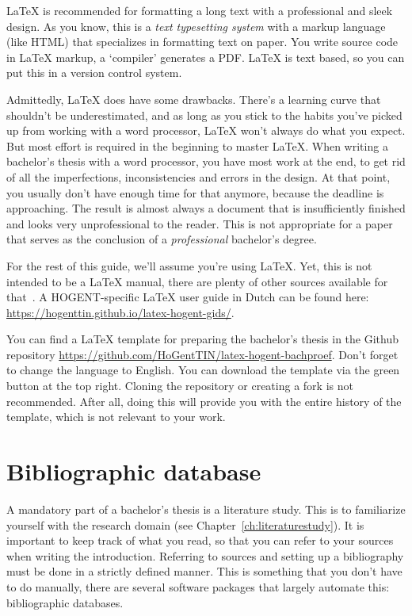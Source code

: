 {\LaTeX} is recommended for formatting a long text with a professional and sleek design. As you know, this is a \emph{text typesetting system} with a markup language (like HTML) that specializes in formatting text on paper. You write source code in {\LaTeX} markup, a `compiler' generates a PDF. {\LaTeX} is text based, so you can put this in a version control system.

Admittedly, {\LaTeX} does have some drawbacks. There's a learning curve that shouldn't be underestimated, and as long as you stick to the habits you've picked up from working with a word processor, {\LaTeX} won't always do what you expect. But most effort is required in the beginning to master {\LaTeX}. When writing a bachelor's thesis with a word processor, you have most work at the end, to get rid of all the imperfections, inconsistencies and errors in the design. At that point, you usually don't have enough time for that anymore, because the deadline is approaching. The result is almost always a document that is insufficiently finished and looks very unprofessional to the reader. This is not appropriate for a paper that serves as the conclusion of a \textit{professional} bachelor's degree.

For the rest of this guide, we'll assume you're using {\LaTeX}. Yet, this is not intended to be a {\LaTeX} manual, there are plenty of other sources available for that~\parencite{Oetiker2015}. A HOGENT-specific {\LaTeX} user guide in Dutch can be found here: \url{https://hogenttin.github.io/latex-hogent-gids/}.

You can find a {\LaTeX} template for preparing the bachelor's thesis in the Github repository \url{https://github.com/HoGentTIN/latex-hogent-bachproef}. Don't forget to change the language to English. You can download the template via the green button at the top right. Cloning the repository or creating a fork is not recommended. After all, doing this will provide you with the entire history of the template, which is not relevant to your work.

\section{Bibliographic database}
\label{sec:bibliografic-database}

A mandatory part of a bachelor's thesis is a literature study. This is to familiarize yourself with the research domain (see Chapter~\ref{ch:literaturestudy}). It is important to keep track of what you read, so that you can refer to your sources when writing the introduction. Referring to sources and setting up a bibliography must be done in a strictly defined manner. This is something that you don't have to do manually, there are several software packages that largely automate this: bibliographic databases.

